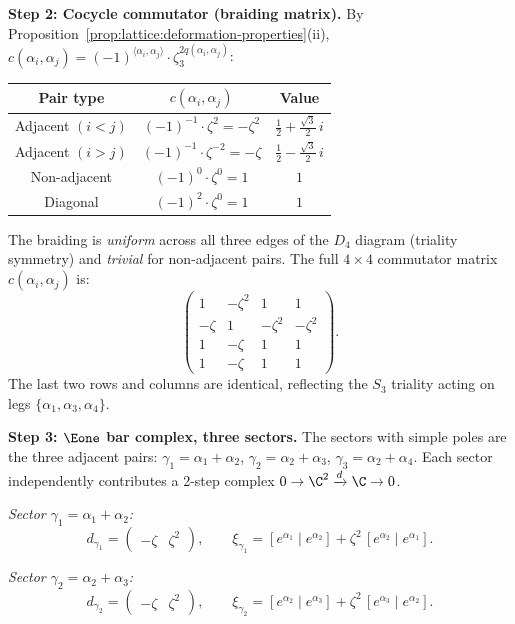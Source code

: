 \begin{computation}[\texorpdfstring{$D_4$}{D_4} at the Coxeter root: \texorpdfstring{$N = 3$}{N = 3}, triality]
\noindent\textbf{Step 2: Cocycle commutator (braiding matrix).}
By Proposition~\ref{prop:lattice:deformation-properties}(ii),
$c(\alpha_i,\alpha_j) = (-1)^{\langle\alpha_i,\alpha_j\rangle}
\cdot \zeta_3^{2q(\alpha_i,\alpha_j)}$:
\begin{center}
\renewcommand{\arraystretch}{1.3}
\begin{tabular}{c c c}
Pair type & $c(\alpha_i,\alpha_j)$ & Value \\
\hline
Adjacent $(i < j)$ & $(-1)^{-1} \cdot \zeta^2 = -\zeta^2$
 & $\tfrac{1}{2} + \tfrac{\sqrt{3}}{2}\,i$ \\
Adjacent $(i > j)$ & $(-1)^{-1} \cdot \zeta^{-2} = -\zeta$
 & $\tfrac{1}{2} - \tfrac{\sqrt{3}}{2}\,i$ \\
Non-adjacent & $(-1)^0 \cdot \zeta^0 = 1$
 & $1$ \\
Diagonal & $(-1)^2 \cdot \zeta^0 = 1$
 & $1$
\end{tabular}
\end{center}
The braiding is \emph{uniform} across all three edges of the $D_4$
diagram (triality symmetry) and \emph{trivial} for non-adjacent pairs.
The full $4 \times 4$ commutator matrix $c(\alpha_i,\alpha_j)$ is:
\[
\begin{pmatrix}
1 & -\zeta^2 & 1 & 1 \\
-\zeta & 1 & -\zeta^2 & -\zeta^2 \\
1 & -\zeta & 1 & 1 \\
1 & -\zeta & 1 & 1
\end{pmatrix}.
\]
The last two rows and columns are identical, reflecting the $S_3$
triality acting on legs $\{\alpha_1, \alpha_3, \alpha_4\}$.
\smallskip

\noindent\textbf{Step 3: $\Eone$ bar complex, three sectors.}
The sectors with simple poles are the three adjacent pairs:
$\gamma_1 = \alpha_1 + \alpha_2$,
$\gamma_2 = \alpha_2 + \alpha_3$,
$\gamma_3 = \alpha_2 + \alpha_4$.
Each sector independently contributes a 2-step complex
$0 \to \C^2 \xrightarrow{d} \C \to 0$.

\emph{Sector $\gamma_1 = \alpha_1 + \alpha_2$:}
\[
d_{\gamma_1}
= \begin{pmatrix} -\zeta & \zeta^2 \end{pmatrix},
\qquad
\xi_{\gamma_1}
= [e^{\alpha_1} \mid e^{\alpha_2}]
 + \zeta^2\,[e^{\alpha_2} \mid e^{\alpha_1}].
\]

\emph{Sector $\gamma_2 = \alpha_2 + \alpha_3$:}
\[
d_{\gamma_2}
= \begin{pmatrix} -\zeta & \zeta^2 \end{pmatrix},
\qquad
\xi_{\gamma_2}
= [e^{\alpha_2} \mid e^{\alpha_3}]
 + \zeta^2\,[e^{\alpha_3} \mid e^{\alpha_2}].
\]


\end{computation}
